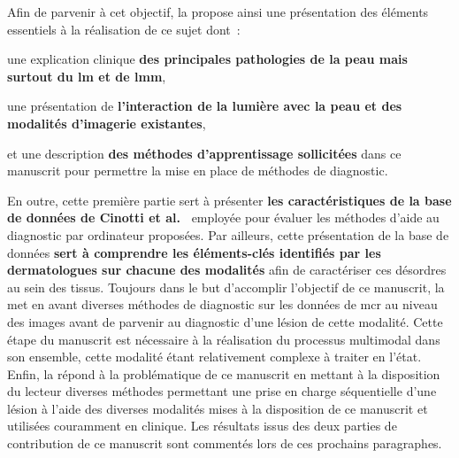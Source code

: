 Afin de parvenir à cet objectif, la  propose ainsi une présentation des éléments essentiels à la réalisation de ce sujet dont~:
\begin{inlinerate}
    \item une explication clinique \textbf{des principales pathologies de la peau mais surtout du \gls{lm} et de \gls{lmm}},
    \item une présentation de \textbf{l'interaction de la lumière avec la peau et des modalités d'imagerie existantes},
    \item et une description \textbf{des méthodes d'apprentissage sollicitées} dans ce manuscrit pour permettre la mise en place de méthodes de diagnostic.
\end{inlinerate} 
En outre, cette première partie sert à présenter \textbf{les caractéristiques de la base de données de Cinotti et al.~\cite{Cinotti2016}} employée pour évaluer les méthodes d'aide au diagnostic par ordinateur proposées. Par ailleurs, cette présentation de la base de données \textbf{sert à comprendre les éléments-clés identifiés par les dermatologues sur chacune des modalités} afin de caractériser ces désordres au sein des tissus. Toujours dans le but d'accomplir l'objectif de ce manuscrit, la  met en avant diverses méthodes de diagnostic sur les données de \gls{mcr} au niveau des images avant de parvenir au diagnostic d'une lésion de cette modalité. Cette étape du manuscrit est nécessaire à la réalisation du processus multimodal dans son ensemble, cette modalité étant relativement complexe à traiter en l'état. Enfin, la  répond à la problématique de ce manuscrit en mettant à la disposition du lecteur diverses méthodes permettant une prise en charge séquentielle d'une lésion à l'aide des diverses modalités mises à la disposition de ce manuscrit et utilisées couramment en clinique. Les résultats issus des deux parties de contribution de ce manuscrit sont commentés lors de ces prochains paragraphes.\par

